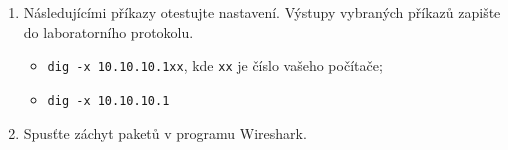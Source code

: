 \documentclass[a4paper,11pt]{article}
\begin{document}
\begin{enumerate}
    \item Následujícími příkazy otestujte nastavení. Výstupy vybraných příkazů zapište do laboratorního protokolu. 
    \begin{itemize}
        \item {\tt dig -x 10.10.10.1xx}, kde {\tt xx} je číslo vašeho počítače;
        \item {\tt dig -x 10.10.10.1}
    \end{itemize}


  \item Spusťte záchyt paketů v programu Wireshark.
  

\end{enumerate}
\end{document}
